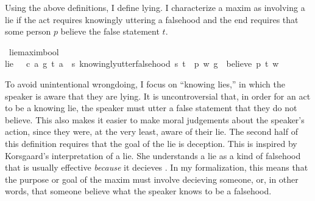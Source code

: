 \begin{isabellebody}
\begin{isamarkuptext}
Using the above definitions, I define lying. I characterize a maxim as involving a lie if 
the act requires knowingly uttering a falsehood and the end requires that some person $p$ believe 
the false statement $t$.%
\end{isamarkuptext}\isamarkuptrue%
\isamarkupfalse%
\ lie{\isacharcolon}{\isacharcolon}{\isachardoublequoteopen}maxim{\isasymRightarrow}bool{\isachardoublequoteclose}\ \ \isanewline
{\isachardoublequoteopen}lie\ {\isasymequiv}\ {\isasymlambda}\ {\isacharparenleft}c{\isacharcomma}\ a{\isacharcomma}\ g{\isacharparenright}{\isachardot}\ {\isasymexists}t{\isachardot}\ {\isacharparenleft}a\ \isactrlbold {\isasymlongrightarrow}\ {\isacharparenleft}{\isasymlambda}s{\isachardot}\ knowingly{\isacharunderscore}utter{\isacharunderscore}falsehood\ s\ t{\isacharparenright}{\isacharparenright}\ {\isasymand}\ {\isacharparenleft}{\isasymexists}p{\isachardot}\ {\isasymforall}w{\isachardot}\ {\isacharparenleft}g\ \isactrlbold {\isasymrightarrow}\ {\isacharparenleft}believe\ p\ t{\isacharparenright}{\isacharparenright}\ w{\isacharparenright}{\isachardoublequoteclose}\isanewline
%
%
\begin{isamarkuptext}%
To avoid unintentional wrongdoing, I focus on ``knowing lies,'' 
in which the speaker is aware that they are lying. It is uncontroversial that, in order for an act to be
a knowing lie, the speaker must utter a false statement that they do not believe. This also makes it 
easier to make moral judgements about the speaker's action, since they were, at the very least, aware
of their lie. The second half of
this definition requires that the goal of the lie is deception. This is inspired by  Korsgaard's interpretation 
of a lie. She understands a lie as a kind of falsehood that is usually effective \emph{because} it decieves
\citep[4]{KorsgaardRTL}. In my formalization, this means that the purpose or goal of the maxim must
involve decieving someone, or, in other words, that someone believe what the speaker knows to be a 
falsehood. 


\end{isamarkuptext}
\end{isabellebody}
